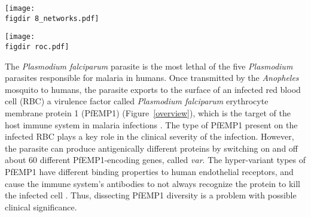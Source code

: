 \documentclass[10pt,twocolumn,superscriptaddress]{revtex4-1}
\newcommand{\var}{{\it var}\xspace}
\newcommand{\pfem}{{PfEMP1}\xspace}
\newcommand{\dbla}{{DBL$\alpha$}\xspace}
\newcommand{\cidra}{{CIDR$\alpha$}\xspace}
\newcommand{\cp}{{Cys/PoLV}\xspace}
\newcommand{\figdir}{figures/}
\begin{document}
\begin{figure*}[t]
	\centering
	\texttt{[image: \\figdir 8\_networks.pdf]}
	\caption{{\bf Various \dbla tag classifications mapped onto the block-sharing network}. (A) \cp analysis for all sequences; (B) BS analysis for all sequences; (C) UPS grouping; (D) \cp analysis for full length \var gene sequences from 6 laboratory isolates; (E) BS analysis for full length \var gene sequences from 6 laboratory isolates; (F) domain cassette (DC) classification for DC4, DC5, DC8 and DC13; (G) predicted EPCR-binding phenotype due to \cidra1.1, \cidra1.4, \cidra1.5, \cidra1.6, \cidra1.7 or \cidra1.8 (Lau et al., 2015) for sequences with \cidra information available; (H) predicted CD36-binding phenotype due to \cidra2, \cidra3, \cidra4, \cidra5 (Robinson et al., 2003) for sequences with \cidra information available. Node colors: For all, unclassified = 0. (A\&D) red = CP1, purple = CP2, pink = CP3, green = CP4, yellow = CP5, brown = CP6. (B\& E) blue = BS1, green = BS2; (C) UPSA = orange, green = UPSB, blue = UPSC; F) pink = DC8, purple = DC5, green = DC13, orange = DC4; G) orange = predicted EPCR binding; H) purple = predicted CD36 binding.}
	\label{8_networks}
\end{figure*}

\begin{figure*}[t]
	\centering
	\texttt{[image: \\figdir roc.pdf]}
	\caption{{\bf Receiver operator curves showing the sensitivity (true positive rate) and specificity (false positive rate) of three \dbla tag classifications (cys2, cys2bs1, cys2bs1\_CP1) in predicting four \var gene features associated with malaria severity: UPSA , DC8, DC13 , \cidra1.} Sequences from the genomes 3D7 and IT4 were excluded because they were used in developing the BS classification.  cys2 = two cysteines within the tag region; cys2bs1 = tag sequences in block-sharing group1 AND have two cysteines, defined as ``group A-like''; cys2bs1\_CP1 = cys2bs1 OR in \cp group 1.}
	\label{roc_curves}
\end{figure*}


The \textit{Plasmodium falciparum} parasite is the most lethal of the five \textit{Plasmodium} parasites responsible for malaria in humans. Once transmitted by the \textit{Anopheles} mosquito to humans, the parasite exports to the surface of an infected red blood cell (RBC) a virulence factor called \textit{Plasmodium falciparum} erythrocyte membrane protein 1 (\pfem) (Figure~\ref{overview}), which is the target of the host immune system in malaria infections \cite{chan2012}. The type of PfEMP1 present on the infected RBC plays a key role in the clinical severity of the infection. However, the parasite can produce antigenically different proteins by switching on and off about 60 different PfEMP1-encoding genes, called \var \cite{gardner2002}. The hyper-variant types of PfEMP1 have different binding properties to human endothelial receptors, and cause the immune system's antibodies to not always recognize the protein to kill the infected cell \cite{gardner2002}. Thus, dissecting PfEMP1 diversity is a problem with possible clinical significance. 
\end{document}

